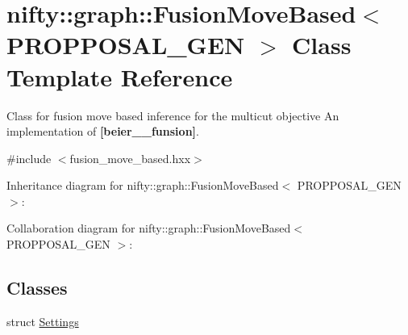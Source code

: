 \hypertarget{classnifty_1_1graph_1_1FusionMoveBased}{}\section{nifty\+:\+:graph\+:\+:Fusion\+Move\+Based$<$ P\+R\+O\+P\+P\+O\+S\+A\+L\+\_\+\+G\+E\+N $>$ Class Template Reference}
\label{classnifty_1_1graph_1_1FusionMoveBased}


Class for fusion move based inference for the multicut objective An implementation of {\bfseries [beier\+\_\+\_\+funsion]}.  




{\ttfamily \#include $<$fusion\+\_\+move\+\_\+based.\+hxx$>$}



Inheritance diagram for nifty\+:\+:graph\+:\+:Fusion\+Move\+Based$<$ P\+R\+O\+P\+P\+O\+S\+A\+L\+\_\+\+G\+E\+N $>$\+:


Collaboration diagram for nifty\+:\+:graph\+:\+:Fusion\+Move\+Based$<$ P\+R\+O\+P\+P\+O\+S\+A\+L\+\_\+\+G\+E\+N $>$\+:
\subsection*{Classes}
\begin{DoxyCompactItemize}
\item 
struct \hyperlink{structnifty_1_1graph_1_1FusionMoveBased_1_1Settings}{Settings}
\end{DoxyCompactItemize}
